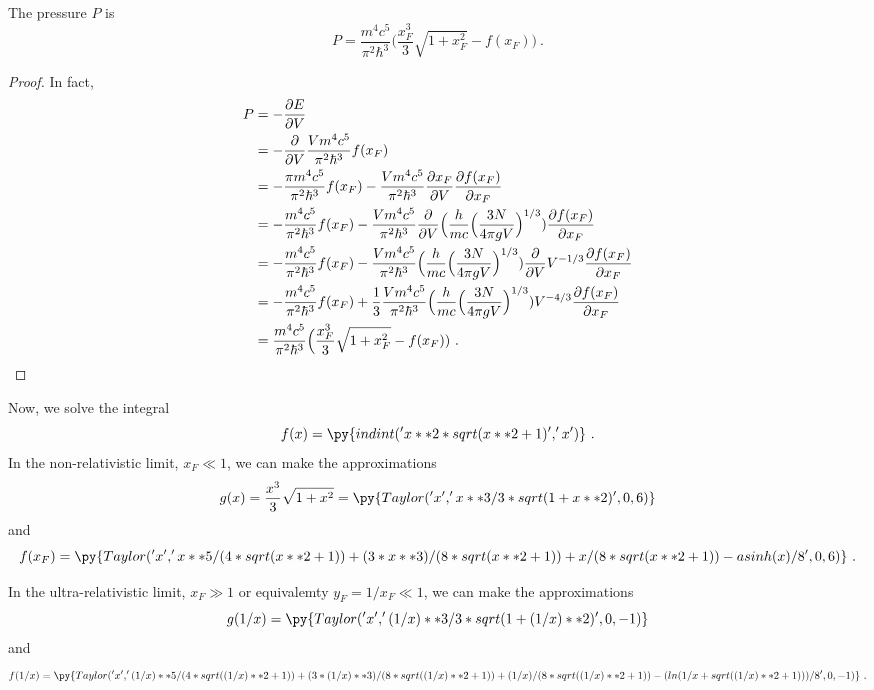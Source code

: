     The pressure $P$ is 
    \begin{equation*}
        P = \frac{m^4 c^5}{\pi^2 \hbar^3} \Big (\frac{x_F^3}{3} \sqrt{1 + x_F^2} - f(x_F)) ~.
    \end{equation*}
    \begin{proof}
        In fact,
        \begin{equation*}
        \begin{aligned}
            P & = - \frac{\partial E}{\partial V} \\ & = - \frac{\partial}{\partial V} \frac{ V m^4 c^5}{\pi^2 \hbar^3} f(x_F) \\ & = - \frac{\pi m^4 c^5}{\pi^2 \hbar^3} f(x_F) - \frac{ V m^4 c^5}{\pi^2 \hbar^3} \frac{\partial x_F}{\partial V} \frac{\partial f(x_F)}{\partial x_F} \\ & = - \frac{ m^4 c^5}{\pi^2 \hbar^3} f(x_F) - \frac{ V m^4 c^5}{\pi^2 \hbar^3} \frac{\partial}{\partial V} \Big (\frac{h}{mc} \Big ( \frac{3 N}{4 \pi g V} \Big)^{1/3}) \frac{\partial f(x_F)}{\partial x_F} \\ & = - \frac{m^4 c^5}{\pi^2 \hbar^3} f(x_F) - \frac{V m^4 c^5}{\pi^2 \hbar^3} \Big (\frac{h}{mc} \Big ( \frac{3 N}{4 \pi g V} \Big)^{1/3}) \frac{\partial}{\partial V} V^{-1/3} \frac{\partial f(x_F)}{\partial x_F} \\ & = - \frac{m^4 c^5}{\pi^2 \hbar^3} f(x_F) + \frac{1}{3} \frac{V m^4 c^5}{\pi^2 \hbar^3} \Big (\frac{h}{mc} \Big ( \frac{3 N}{4 \pi g V} \Big)^{1/3}) V^{-4/3} \frac{\partial f(x_F)}{\partial x_F} \\ & = \frac{m^4 c^5}{\pi^2 \hbar^3} \Big (\frac{x_F^3}{3} \sqrt{1 + x_F^2} - f(x_F)) ~.
        \end{aligned}
        \end{equation*}
    \end{proof}

    Now, we solve the integral 
    \begin{equation*}
        f(x) = \py{indint('x**2 * sqrt(x**2 + 1)', 'x')} ~.
    \end{equation*}
    In the non-relativistic limit, $x_F \ll 1$, we can make the approximations 
    \begin{equation*}
        g(x) = \frac{x^3}{3} \sqrt{1 + x^2} = \py{Taylor('x', 'x**3 / 3 * sqrt(1 + x**2)', 0, 6)}
    \end{equation*}
    and 
    \begin{equation*}
        f(x_F) = \py{Taylor('x', 'x**5 / (4 * sqrt(x**2 + 1)) + ( 3 * x**3) / (8 * sqrt(x**2 + 1)) + x / (8 * sqrt(x**2 + 1)) - asinh(x) / 8', 0, 6)} ~.
    \end{equation*}

    In the ultra-relativistic limit, $x_F \gg 1$ or equivalemty $y_F = 1 / x_F \ll 1$, we can make the approximations 
    \begin{equation*}
        g(1/x) = \py{Taylor('x', '(1 / x)**3 / 3 * sqrt(1 + (1 / x)**2)', 0, -1)}
    \end{equation*}
    and 
    \begin{equation*}
        f(1 / x) = \py{Taylor('x', '(1 / x)**5 / (4 * sqrt((1 / x)**2 + 1)) + ( 3 * (1 / x)**3) / (8 * sqrt((1 / x)**2 + 1)) + (1 / x) / (8 * sqrt((1 / x)**2 + 1)) - (ln ( 1 / x + sqrt((1/x)**2 + 1))) / 8', 0, -1)} ~.
    \end{equation*}
    
